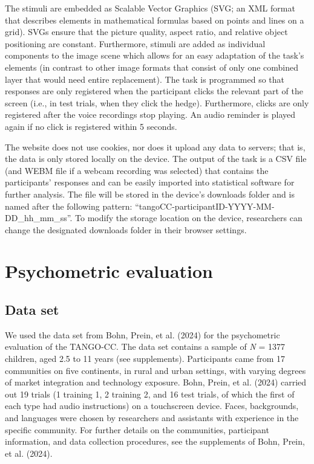 \documentclass[
  man,floatsintext]{apa7}
\begin{document}
The stimuli are embedded as Scalable Vector Graphics (SVG; an XML format that describes elements in mathematical formulas based on points and lines on a grid).
SVGs ensure that the picture quality, aspect ratio, and relative object positioning are constant.
Furthermore, stimuli are added as individual components to the image scene which allows for an easy adaptation of the task's elements (in contrast to other image formats that consist of only one combined layer that would need entire replacement).
The task is programmed so that responses are only registered when the participant clicks the relevant part of the screen (i.e., in test trials, when they click the hedge).
Furthermore, clicks are only registered after the voice recordings stop playing.
An audio reminder is played again if no click is registered within 5 seconds.

The website does not use cookies, nor does it upload any data to servers; that is, the data is only stored locally on the device.
The output of the task is a CSV file (and WEBM file if a webcam recording was selected) that contains the participants' responses and can be easily imported into statistical software for further analysis.
The file will be stored in the device's downloads folder and is named after the following pattern: ``tangoCC-participantID-YYYY-MM-DD\_hh\_mm\_ss''. To modify the storage location on the device, researchers can change the designated downloads folder in their browser settings.

\section{Psychometric evaluation}\label{psychometric-evaluation}

\subsection{Data set}\label{data-set}

We used the data set from Bohn, Prein, et al. (2024) for the psychometric evaluation of the TANGO-CC.
The data set contains a sample of \emph{N} = 1377 children, aged 2.5 to 11 years (see supplements).
Participants came from 17 communities on five continents, in rural and urban settings, with varying degrees of market integration and technology exposure.
Bohn, Prein, et al. (2024) carried out 19 trials (1 training 1, 2 training 2, and 16 test trials, of which the first of each type had audio instructions) on a touchscreen device.
Faces, backgrounds, and languages were chosen by researchers and assistants with experience in the specific community.
For further details on the communities, participant information, and data collection procedures, see the supplements of Bohn, Prein, et al. (2024).
\end{document}
